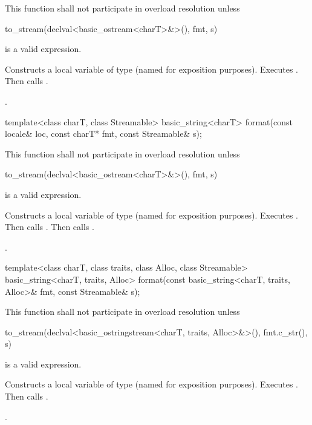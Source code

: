 \begin{itemdescr}
\pnum
\remarks
This function shall not participate in overload resolution unless
\begin{codeblock}
to_stream(declval<basic_ostream<charT>&>(), fmt, s)
\end{codeblock}
is a valid expression.

\pnum
\effects
Constructs a local variable of type
(named  for exposition purposes).
Executes .
Then calls .

\pnum
\returns {}.
\end{itemdescr}

\begin{itemdecl}
template<class charT, class Streamable>
  basic_string<charT>
    format(const locale& loc, const charT* fmt, const Streamable& s);
\end{itemdecl}

\begin{itemdescr}
\pnum
\remarks
This function shall not participate in overload resolution unless
\begin{codeblock}
to_stream(declval<basic_ostream<charT>&>(), fmt, s)
\end{codeblock}
is a valid expression.

\pnum
\effects
Constructs a local variable of type
(named  for exposition purposes).
Executes .
Then calls .
Then calls .

\pnum
\returns {}.
\end{itemdescr}

\begin{itemdecl}
template<class charT, class traits, class Alloc, class Streamable>
  basic_string<charT, traits, Alloc>
    format(const basic_string<charT, traits, Alloc>& fmt, const Streamable& s);
\end{itemdecl}

\begin{itemdescr}
\pnum
\remarks
This function shall not participate in overload resolution unless
\begin{codeblock}
to_stream(declval<basic_ostringstream<charT, traits, Alloc>&>(), fmt.c_str(), s)
\end{codeblock}
is a valid expression.

\pnum
\effects
Constructs a local variable of type
(named  for exposition purposes).
Executes .
Then calls .

\pnum
\returns {}.
\end{itemdescr}


